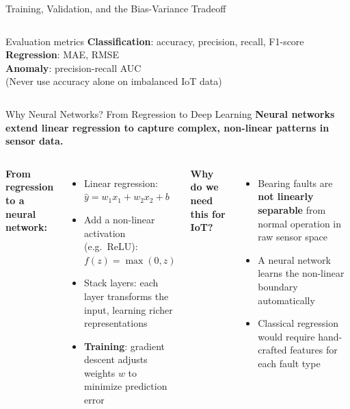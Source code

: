 \documentclass[aspectratio=169,11pt]{beamer}
\begin{document}
\begin{frame}{Training, Validation, and the Bias-Variance Tradeoff}
\begin{columns}
        \vspace{0.03cm}
        \begin{exampleblock}{Evaluation metrics}
            \textbf{Classification}: accuracy, precision, recall, F1-score\\
            \textbf{Regression}: MAE, RMSE\\
            \textbf{Anomaly}: precision-recall AUC\\
            (Never use accuracy alone on imbalanced IoT data)
        \end{exampleblock}
    \end{columns}
\end{frame}

\begin{frame}{Why Neural Networks? From Regression to Deep Learning}
    \scriptsize
    \textbf{Neural networks extend linear regression to capture complex, non-linear patterns in sensor data.}

    \vspace{0.05cm}
    \begin{columns}
        \textbf{From regression to a neural network:}
        \begin{itemize}\setlength{\itemsep}{1pt}
            \item Linear regression: $\hat{y} = w_1 x_1 + w_2 x_2 + b$
            \item Add a non-linear activation (e.g.\ ReLU): $f(z) = \max(0, z)$
            \item Stack layers: each layer transforms the input, learning richer representations
            \item \textbf{Training}: gradient descent adjusts weights $w$ to minimize prediction error
        \end{itemize}

        \vspace{0.03cm}
        \textbf{Why do we need this for IoT?}
        \begin{itemize}\setlength{\itemsep}{1pt}
            \item Bearing faults are \textbf{not linearly separable} from normal operation in raw sensor space
            \item A neural network learns the non-linear boundary automatically
            \item Classical regression would require hand-crafted features for each fault type
        \end{itemize}


\end{columns}
\end{frame}
\end{document}
